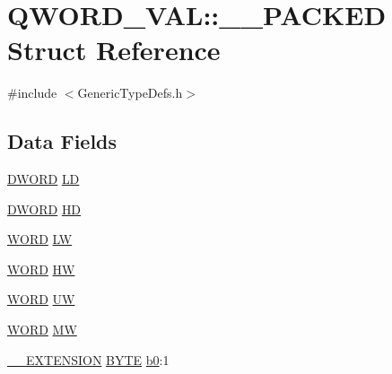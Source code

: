 \hypertarget{struct_q_w_o_r_d___v_a_l_1_1_____p_a_c_k_e_d}{}\section{Q\+W\+O\+R\+D\+\_\+\+V\+A\+L\+:\+:\+\_\+\+\_\+\+P\+A\+C\+K\+E\+D Struct Reference}
\label{struct_q_w_o_r_d___v_a_l_1_1_____p_a_c_k_e_d}


{\ttfamily \#include $<$Generic\+Type\+Defs.\+h$>$}

\subsection*{Data Fields}
\begin{DoxyCompactItemize}
\item 
\hyperlink{_generic_type_defs_8h_ad342ac907eb044443153a22f964bf0af}{D\+W\+O\+R\+D} \hyperlink{struct_q_w_o_r_d___v_a_l_1_1_____p_a_c_k_e_d_a420a032bb8b74ce6e42d17ae8614956c}{L\+D}
\item 
\hyperlink{_generic_type_defs_8h_ad342ac907eb044443153a22f964bf0af}{D\+W\+O\+R\+D} \hyperlink{struct_q_w_o_r_d___v_a_l_1_1_____p_a_c_k_e_d_a8acf69c9788d64089228e6d840d285c3}{H\+D}
\item 
\hyperlink{_generic_type_defs_8h_a2b0e863dadf920709ec53d9088ee7c91}{W\+O\+R\+D} \hyperlink{struct_q_w_o_r_d___v_a_l_1_1_____p_a_c_k_e_d_a19457eba8e3d1d0a4882a78dd1c18fa1}{L\+W}
\item 
\hyperlink{_generic_type_defs_8h_a2b0e863dadf920709ec53d9088ee7c91}{W\+O\+R\+D} \hyperlink{struct_q_w_o_r_d___v_a_l_1_1_____p_a_c_k_e_d_a30cc0c9ca08d23adb30394d6be57fe48}{H\+W}
\item 
\hyperlink{_generic_type_defs_8h_a2b0e863dadf920709ec53d9088ee7c91}{W\+O\+R\+D} \hyperlink{struct_q_w_o_r_d___v_a_l_1_1_____p_a_c_k_e_d_aa5825a5a85c9727c5decfc258d403f54}{U\+W}
\item 
\hyperlink{_generic_type_defs_8h_a2b0e863dadf920709ec53d9088ee7c91}{W\+O\+R\+D} \hyperlink{struct_q_w_o_r_d___v_a_l_1_1_____p_a_c_k_e_d_adca13508707068fcef191c92db9df686}{M\+W}
\item 
\hyperlink{_generic_type_defs_8h_a6f634b0fdcc4febac630fc28e2685ddb}{\+\_\+\+\_\+\+E\+X\+T\+E\+N\+S\+I\+O\+N} \hyperlink{_generic_type_defs_8h_a4ae1dab0fb4b072a66584546209e7d58}{B\+Y\+T\+E} \hyperlink{struct_q_w_o_r_d___v_a_l_1_1_____p_a_c_k_e_d_a4010350907c88306a36c21694097c1ca}{b0}\+:1
\item 

\end{DoxyCompactItemize}
